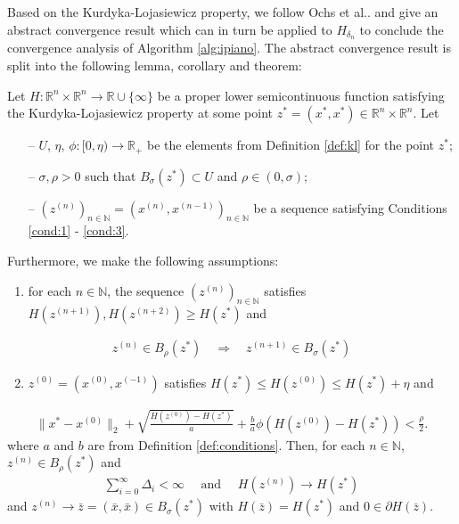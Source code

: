 \documentclass[onecolumn,final,a4paper,13pt,reqno]{siamart}
\makeatletter
\DeclareRobustCommand\onedot{\futurelet\@let@token\@onedot}
\def\@onedot{\ifx\@let@token.\else.\null\fi\xspace}
\def\etal{{et al}\onedot}
\makeatother
\begin{document}
Based on the Kurdyka-Lojasiewicz property, we follow Ochs \etal and give an abstract convergence result which can in turn be applied to $H_{\delta_n}$ to conclude the convergence analysis of Algorithm \ref{alg:ipiano}. The abstract convergence result is split into the following lemma, corollary and theorem:

\begin{lemmamd}
	Let $H : \mathbb{R}^n \times \mathbb{R}^n \rightarrow \mathbb{R} \cup \{\infty\}$ be a proper lower semicontinuous function satisfying the Kurdyka-Lojasiewicz property at some point $z^\ast = (x^\ast, x^\ast) \in \mathbb{R}^n \times \mathbb{R}^n$. Let
	\begin{itemize}
		\item[--] $U$, $\eta$, $\phi : [0, \eta) \rightarrow \mathbb{R}_+$  be the elements from Definition \ref{def:kl} for the point $z^\ast$;
		\item[--] $\sigma, \rho > 0$ such that $B_\sigma(z^\ast) \subset U$ and $\rho \in (0, \sigma)$;
		\item[--] $(z^{(n)})_{n \in \mathbb{N}} = (x^{(n)}, x^{(n - 1)})_{n \in \mathbb{N}}$ be a sequence satisfying Conditions \ref{cond:1} - \ref{cond:3}.
	\end{itemize}
	Furthermore, we make the following assumptions:
	\begin{enumerate}[label=(A\arabic*)]
		\item for each $n \in \mathbb{N}$, the sequence $(z^{(n)})_{n \in \mathbb{N}}$ satisfies $H(z^{(n + 1)}), H(z^{(n + 2)}) \geq H(z^\ast)$ and\label{ass:1}
	\end{enumerate}
	\begin{align}
		z^{(n)} \in B_\rho(z^\ast) \quad \Rightarrow \quad z^{(n + 1)} \in B_\sigma(z^\ast)
	\end{align}
	\begin{enumerate}[label=(A\arabic*)]
		\setcounter{enumi}{1}
		\item $z^{(0)} = (x^{(0)}, x^{(-1)})$ satisfies $H(z^\ast) \leq H(z^{(0)}) \leq H(z^\ast) + \eta$ and\label{ass:2}
	\end{enumerate}
	\begin{align}
		\|x^\ast - x^{(0)}\|_2 + \sqrt{\frac{H(z^{(0)}) - H(z^\ast)}{a}} + \frac{b}{a} \phi(H(z^{(0)}) - H(z^\ast)) < \frac{\rho}{2}.
	\end{align}
	where $a$ and $b$ are from Definition \ref{def:conditions}. Then, for each $n \in \mathbb{N}$, $z^{(n)} \in B_\rho(z^\ast)$ and
	\begin{align}
		\sum_{i = 0}^\infty \Delta_i < \infty\quad\text{ and }\quad H(z^{(n)}) \rightarrow H(z^\ast)
	\end{align}
	and $z^{(n)} \rightarrow \bar{z} = (\bar{x}, \bar{x}) \in B_\sigma(z^\ast)$ with $H(\bar{z}) = H(z^\ast)$ and $0 \in \partial H(\bar{z})$.\label{lemma:lemma}
\end{lemmamd}
\end{document}

